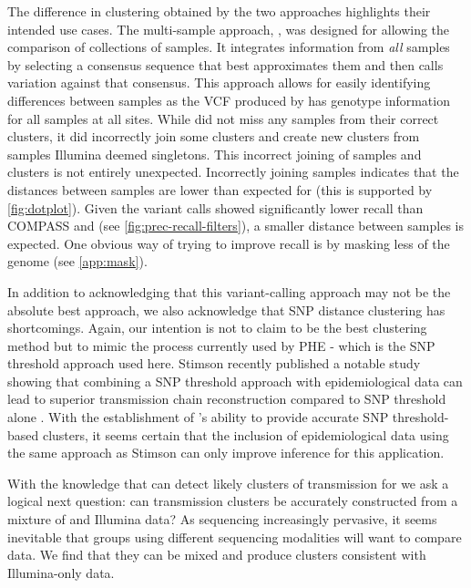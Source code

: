 The difference in clustering obtained by the two \pandora{} approaches highlights their intended use cases. The multi-sample approach, \compare{}, was designed for allowing the comparison of collections of samples. It integrates information from \emph{all} samples by selecting a consensus sequence that best approximates them and then calls variation against that consensus. This approach allows for easily identifying differences between samples as the VCF produced by \compare{} has genotype information for all samples at all sites. While \compare{} did not miss any samples from their correct clusters, it did incorrectly join some clusters and create new clusters from samples Illumina deemed singletons. This incorrect joining of samples and clusters is not entirely unexpected. Incorrectly joining samples indicates that the distances between samples are lower than expected for \compare{} (this is supported by \autoref{fig:dotplot}). Given the \pandora{} variant calls showed significantly lower recall than COMPASS and \bcftools{} (see \autoref{fig:prec-recall-filters}), a smaller distance between samples is expected. One obvious way of trying to improve recall is by masking less of the genome (see \autoref{app:mask}). 

In addition to acknowledging that this variant-calling approach may not be the absolute best approach, we also acknowledge that SNP distance clustering has shortcomings. Again, our intention is not to claim to be the best clustering method but to mimic the process currently used by PHE - which is the SNP threshold approach used here. Stimson \etal{} recently published a notable study showing that combining a SNP threshold approach with epidemiological data can lead to superior transmission chain reconstruction compared to SNP threshold alone \cite{stimson2019}. With the establishment of \ont{}'s ability to provide accurate SNP threshold-based clusters, it seems certain that the inclusion of epidemiological data using the same approach as Stimson \etal{} can only improve inference for this application.

With the knowledge that \ont{} can detect likely clusters of transmission for \mtb{} we ask a logical next question: can transmission clusters be accurately constructed from a mixture of \ont{} and Illumina data? As \ont{} sequencing increasingly pervasive, it seems inevitable that groups using different sequencing modalities will want to compare data. We find that they can be mixed and produce clusters consistent with Illumina-only data. 


